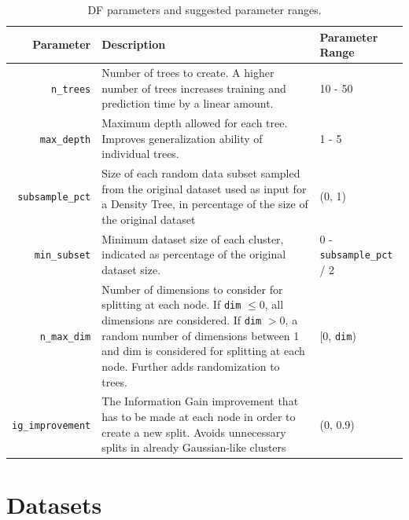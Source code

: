 \documentclass[10pt]{article}
\begin{document}
\begin{table}[H]
    \centering
    \begin{tabular}{rp{7.7cm}l}
    \toprule
    Parameter & Description & Parameter Range \\ \midrule
    \texttt{n\_trees} & Number of trees to create. A higher number of trees increases training and prediction time by a linear amount. & 10 - 50 \\
    \texttt{max\_depth} & Maximum depth allowed for each tree. Improves generalization ability of individual trees. & 1 - 5 \\
    \texttt{subsample\_pct} & Size of each random data subset sampled from the original dataset used as input for a Density Tree, in percentage of the size of the original dataset &  (0, 1) \\
    \texttt{min\_subset} & Minimum dataset size of each cluster, indicated as percentage of the original dataset size. & 0 - \texttt{subsample\_pct} / 2 \\
    \texttt{n\_max\_dim} & Number of dimensions to consider for splitting at each node. If \texttt{dim} $\leq 0$, all dimensions are considered. If \texttt{dim} $> 0$, a random number of dimensions between 1 and dim is considered for splitting at each node. Further adds randomization to trees. & ${[}$0, \texttt{dim}) \\
    \texttt{ig\_improvement} & The Information Gain improvement that has to be made at each node in order to create a new split. Avoids unnecessary splits in already Gaussian-like clusters & (0, 0.9) \\\bottomrule
    \end{tabular}
    \caption{\acrlong{DF} parameters and suggested parameter ranges.}
    \label{table:df-parameters}
\end{table}


\section{Datasets}
\label{sec:datasets}
\end{document}

